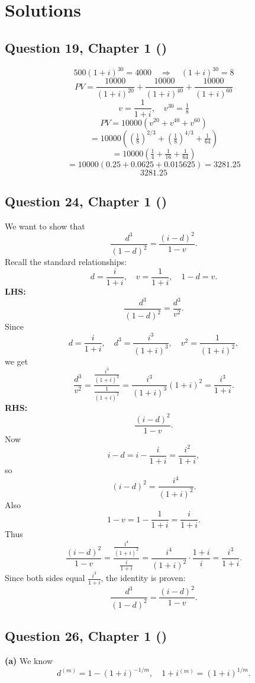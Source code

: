 \documentclass[12pt, a4paper]{article}
\begin{document}
\newpage

\section*{Solutions}

\subsection*{Question 19, Chapter 1  (\cite{toi3rd})}

\[
500(1+i)^{30} = 4000 \quad \Rightarrow \quad (1+i)^{30} = 8
\]
\[
PV = \frac{10000}{(1+i)^{20}} + \frac{10000}{(1+i)^{40}} + \frac{10000}{(1+i)^{60}}
\]
\[
v = \frac{1}{1+i}, \quad v^{30} = \tfrac{1}{8}
\]
\[
PV = 10000\left(v^{20} + v^{40} + v^{60}\right)
\]
\[
= 10000\left(\left(\tfrac{1}{8}\right)^{2/3} + \left(\tfrac{1}{8}\right)^{4/3} + \tfrac{1}{64}\right)
\]
\[
= 10000\left(\tfrac{1}{4} + \tfrac{1}{16} + \tfrac{1}{64}\right)
\]
\[
= 10000\left(0.25 + 0.0625 + 0.015625\right) = 3281.25
\]
\[
\boxed{3281.25}
\]

\subsection*{Question 24, Chapter 1  (\cite{toi3rd})}

We want to show that
\[
\frac{d^3}{(1-d)^2} = \frac{(i-d)^2}{1-v}.
\]
Recall the standard relationships:
\[
d = \frac{i}{1+i}, \quad v = \frac{1}{1+i}, \quad 1-d = v.
\]
\textbf{LHS:}
\[
\frac{d^3}{(1-d)^2} = \frac{d^3}{v^2}.
\]
Since
\[
d = \frac{i}{1+i}, \quad d^3 = \frac{i^3}{(1+i)^3}, \quad v^2 = \frac{1}{(1+i)^2},
\]
we get
\[
\frac{d^3}{v^2} = \frac{\tfrac{i^3}{(1+i)^3}}{\tfrac{1}{(1+i)^2}}
= \frac{i^3}{(1+i)^3}(1+i)^2 = \frac{i^3}{1+i}.
\]
\textbf{RHS:}
\[
\frac{(i-d)^2}{1-v}.
\]
Now
\[
i-d = i - \frac{i}{1+i} = \frac{i^2}{1+i},
\]
so
\[
(i-d)^2 = \frac{i^4}{(1+i)^2}.
\]
Also
\[
1-v = 1 - \frac{1}{1+i} = \frac{i}{1+i}.
\]
Thus
\[
\frac{(i-d)^2}{1-v} = \frac{\tfrac{i^4}{(1+i)^2}}{\tfrac{i}{1+i}}
= \frac{i^4}{(1+i)^2}\cdot \frac{1+i}{i}
= \frac{i^3}{1+i}.
\]
Since both sides equal \(\tfrac{i^3}{1+i}\), the identity is proven:
\[
\frac{d^3}{(1-d)^2} = \frac{(i-d)^2}{1-v}.
\]

\subsection*{Question 26, Chapter 1  (\cite{toi3rd})}

\textbf{(a)} We know
\[
d^{(m)} = 1 - (1+i)^{-1/m}, \quad 
1+i^{(m)} = (1+i)^{1/m}.
\]
\end{document}
